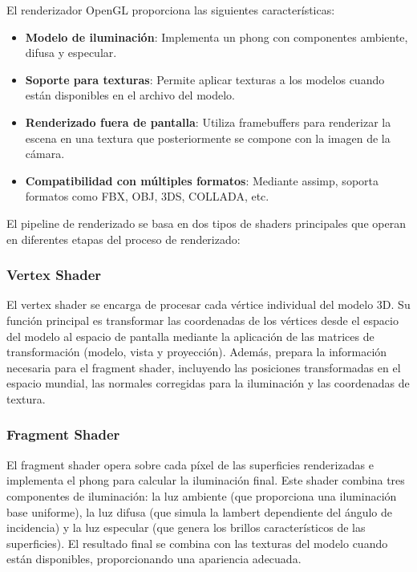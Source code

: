 El renderizador OpenGL proporciona las siguientes características:

\begin{itemize}
    \item \textbf{Modelo de iluminación}: Implementa un \gls{phong} con componentes ambiente, difusa y especular.
    \item \textbf{Soporte para texturas}: Permite aplicar texturas a los modelos cuando están disponibles en el archivo del modelo.
    \item \textbf{Renderizado fuera de pantalla}: Utiliza framebuffers para renderizar la escena en una textura que posteriormente se compone con la imagen de la cámara.
    \item \textbf{Compatibilidad con múltiples formatos}: Mediante \acrshort{assimp}, soporta formatos como FBX, OBJ, 3DS, COLLADA, etc.
\end{itemize}

El pipeline de renderizado se basa en dos tipos de shaders principales que operan en diferentes etapas del proceso de renderizado:

\subsubsection{Vertex Shader}
El vertex shader se encarga de procesar cada vértice individual del modelo 3D. Su función principal es transformar las coordenadas de los vértices desde el espacio del modelo al espacio de pantalla mediante la aplicación de las matrices de transformación (modelo, vista y proyección). Además, prepara la información necesaria para el fragment shader, incluyendo las posiciones transformadas en el espacio mundial, las normales corregidas para la iluminación y las coordenadas de textura.

\subsubsection{Fragment Shader}
El fragment shader opera sobre cada píxel de las superficies renderizadas e implementa el \gls{phong} para calcular la iluminación final. Este shader combina tres componentes de iluminación: la luz ambiente (que proporciona una iluminación base uniforme), la luz difusa (que simula la \gls{lambert} dependiente del ángulo de incidencia) y la luz especular (que genera los brillos característicos de las superficies). El resultado final se combina con las texturas del modelo cuando están disponibles, proporcionando una apariencia adecuada.

